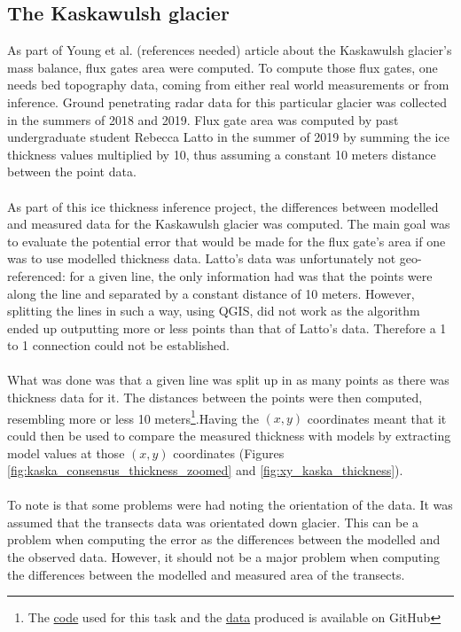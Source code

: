 \documentclass[a4, 12pt]{article}
\begin{document}
\subsection{The Kaskawulsh glacier}
As part of Young et al. (references needed) article about the Kaskawulsh glacier's mass balance, flux gates area were computed. To compute those flux gates, one needs bed topography data, coming from either real world measurements or from inference. Ground penetrating radar data for this particular glacier was collected in the summers of 2018 and 2019. Flux gate area was computed by past undergraduate student Rebecca Latto in the summer of 2019 by summing the ice thickness values multiplied by 10, thus assuming a constant 10 meters distance between the point data.
\\
\\
As part of this ice thickness inference project, the differences between modelled and measured data for the Kaskawulsh glacier was computed. The main goal was to evaluate the potential error that would be made for the flux gate's area if one was to use modelled thickness data.
Latto's data was unfortunately not geo-referenced: for a given line, the only information had was that the points were along the line and separated by a constant distance of 10 meters. However, splitting the lines in such a way, using QGIS, did not work as the algorithm ended up outputting more or less points than that of Latto's data. Therefore a 1 to 1 connection could not be established.
\\
\\
What was done was that a given line was split up in as many points as there was thickness data for it. The distances between the points were then computed, resembling more or less 10 meters\footnote{The \href{https://github.com/aleximorin/USRA-2020-AlexiMorin/blob/master/treat_kaskawulsh_files.py}{code} used for this task and the \href{https://github.com/aleximorin/USRA-2020-AlexiMorin/blob/master/kaska_gps.csv}{data} produced is available on GitHub}.Having the $(x, y)$ coordinates meant that it could then be used to compare the measured thickness with models by extracting model values at those $(x, y)$ coordinates (Figures \ref{fig:kaska_consensus_thickness_zoomed} and \ref{fig:xy_kaska_thickness}).
\\
\\
To note is that some problems were had noting the orientation of the data. It was assumed that the transects data was orientated down glacier. This can be a problem when computing the error as the differences between the modelled and the observed data. However, it should not be a major problem when computing the differences between the modelled and measured area of the transects.
\end{document}
